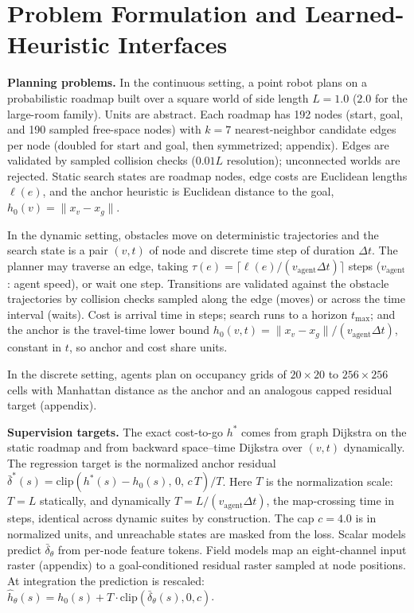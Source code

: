 \documentclass[letterpaper]{article} %
\begin{document}
\section{Problem Formulation and Learned-Heuristic Interfaces}

\textbf{Planning problems.} In the continuous setting, a point robot plans on a probabilistic roadmap \citep[PRM;][]{kavraki1996prm} built over a square world of side length $L{=}1.0$ ($2.0$ for the large-room family). Units are abstract. Each roadmap has 192 nodes (start, goal, and 190 sampled free-space nodes) with $k{=}7$ nearest-neighbor candidate edges per node (doubled for start and goal, then symmetrized; appendix). Edges are validated by sampled collision checks ($0.01L$ resolution); unconnected worlds are rejected. Static search states are roadmap nodes, edge costs are Euclidean lengths $\ell(e)$, and the anchor heuristic is Euclidean distance to the goal, $h_0(v) = \lVert x_v - x_g \rVert$.

In the dynamic setting, obstacles move on deterministic trajectories and the search state is a pair $(v,t)$ of node and discrete time step of duration $\Delta t$. The planner may traverse an edge, taking $\tau(e) = \lceil \ell(e) / (v_{\mathrm{agent}} \Delta t) \rceil$ steps ($v_{\mathrm{agent}}$: agent speed), or wait one step. Transitions are validated against the obstacle trajectories by collision checks sampled along the edge (moves) or across the time interval (waits). Cost is arrival time in steps; search runs to a horizon $t_{\max}$; and the anchor is the travel-time lower bound $h_0(v,t) = \lVert x_v - x_g \rVert / (v_{\mathrm{agent}} \Delta t)$, constant in $t$, so anchor and cost share units.

In the discrete setting, agents plan on occupancy grids of $20{\times}20$ to $256{\times}256$ cells with Manhattan distance as the anchor and an analogous capped residual target (appendix).

\textbf{Supervision targets.} The exact cost-to-go $h^{*}$ comes from graph Dijkstra on the static roadmap and from backward space--time Dijkstra over $(v,t)$ dynamically. The regression target is the normalized anchor residual $\bar\delta^{*}(s) = \mathrm{clip}\!\left(h^{*}(s) - h_0(s),\, 0,\, c\,T\right)/T$. Here $T$ is the normalization scale: $T{=}L$ statically, and dynamically $T = L/(v_{\mathrm{agent}}\Delta t)$, the map-crossing time in steps, identical across dynamic suites by construction. The cap $c{=}4.0$ is in normalized units, and unreachable states are masked from the loss. Scalar models predict $\bar\delta_\theta$ from per-node feature tokens. Field models map an eight-channel input raster (appendix) to a goal-conditioned residual raster sampled at node positions. At integration the prediction is rescaled: $\hat h_\theta(s) = h_0(s) + T \cdot \mathrm{clip}(\bar\delta_\theta(s), 0, c)$.
\end{document}
